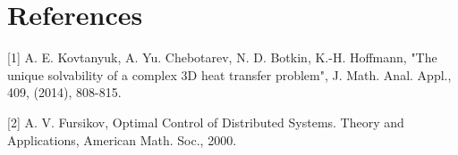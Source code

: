 \documentclass[10pt]{article}
\begin{document}
\section{References}
[1] A. E. Kovtanyuk, A. Yu. Chebotarev, N. D. Botkin, K.-H. Hoffmann, "The unique solvability of a complex 3D heat transfer problem", J. Math. Anal. Appl., 409, (2014), 808-815.

[2] A. V. Fursikov, Optimal Control of Distributed Systems. Theory and Applications, American Math. Soc., 2000.
\end{document}
